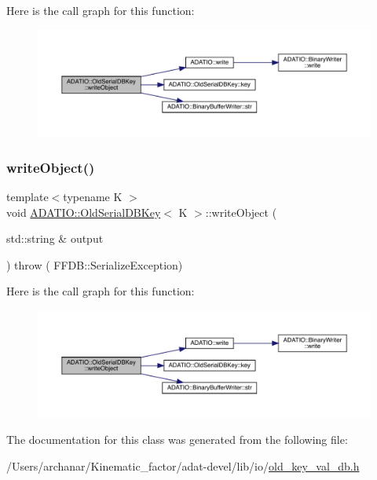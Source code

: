 Here is the call graph for this function\+:
\nopagebreak
\begin{figure}[H]
\begin{center}
\leavevmode
\includegraphics[width=350pt]{dc/d7d/classADATIO_1_1OldSerialDBKey_a4cc6346697a7bda74b9e14672cf21912_cgraph}
\end{center}
\end{figure}
\mbox{\label{classADATIO_1_1OldSerialDBKey_a4cc6346697a7bda74b9e14672cf21912}} 
\subsubsection{\texorpdfstring{writeObject()}{writeObject()}\hspace{0.1cm}{\footnotesize\ttfamily [3/3]}}
{\footnotesize\ttfamily template$<$typename K $>$ \\
void \mbox{\hyperlink{classADATIO_1_1OldSerialDBKey}{A\+D\+A\+T\+I\+O\+::\+Old\+Serial\+D\+B\+Key}}$<$ K $>$\+::write\+Object (\begin{DoxyParamCaption}\item[{std\+::string \&}]{output }\end{DoxyParamCaption}) throw ( F\+F\+D\+B\+::\+Serialize\+Exception) \hspace{0.3cm}{\ttfamily [inline]}}

Here is the call graph for this function\+:
\nopagebreak
\begin{figure}[H]
\begin{center}
\leavevmode
\includegraphics[width=350pt]{dc/d7d/classADATIO_1_1OldSerialDBKey_a4cc6346697a7bda74b9e14672cf21912_cgraph}
\end{center}
\end{figure}


The documentation for this class was generated from the following file\+:\begin{DoxyCompactItemize}
\item 
/\+Users/archanar/\+Kinematic\+\_\+factor/adat-\/devel/lib/io/\mbox{\hyperlink{adat-devel_2lib_2io_2old__key__val__db_8h}{old\+\_\+key\+\_\+val\+\_\+db.\+h}}\end{DoxyCompactItemize}
